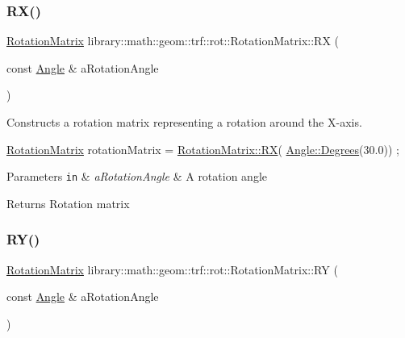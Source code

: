 \subsubsection{\texorpdfstring{R\+X()}{RX()}}
{\footnotesize\ttfamily \hyperlink{classlibrary_1_1math_1_1geom_1_1trf_1_1rot_1_1_rotation_matrix}{Rotation\+Matrix} library\+::math\+::geom\+::trf\+::rot\+::\+Rotation\+Matrix\+::\+RX (\begin{DoxyParamCaption}\item[{const \hyperlink{classlibrary_1_1math_1_1geom_1_1_angle}{Angle} \&}]{a\+Rotation\+Angle }\end{DoxyParamCaption})\hspace{0.3cm}{\ttfamily [static]}}



Constructs a rotation matrix representing a rotation around the X-\/axis. 


\begin{DoxyCode}
\hyperlink{classlibrary_1_1math_1_1geom_1_1trf_1_1rot_1_1_rotation_matrix_a667d2c05aa5b0cc88775938d11164cdc}{RotationMatrix} rotationMatrix = \hyperlink{classlibrary_1_1math_1_1geom_1_1trf_1_1rot_1_1_rotation_matrix_afe1aa8480e121065aa0c35fdf273811c}{RotationMatrix::RX}(
      \hyperlink{classlibrary_1_1math_1_1geom_1_1_angle_a64aa53e8420aeb6f671d86c65c370bc8}{Angle::Degrees}(30.0)) ;
\end{DoxyCode}



\begin{DoxyParams}[1]{Parameters}
\mbox{\tt in}  & {\em a\+Rotation\+Angle} & A rotation angle \\
\hline
\end{DoxyParams}
\begin{DoxyReturn}{Returns}
Rotation matrix 
\end{DoxyReturn}
\mbox{\label{classlibrary_1_1math_1_1geom_1_1trf_1_1rot_1_1_rotation_matrix_a165cef74c455c3651bd33cb2a86d2a93}} 
\subsubsection{\texorpdfstring{R\+Y()}{RY()}}
{\footnotesize\ttfamily \hyperlink{classlibrary_1_1math_1_1geom_1_1trf_1_1rot_1_1_rotation_matrix}{Rotation\+Matrix} library\+::math\+::geom\+::trf\+::rot\+::\+Rotation\+Matrix\+::\+RY (\begin{DoxyParamCaption}\item[{const \hyperlink{classlibrary_1_1math_1_1geom_1_1_angle}{Angle} \&}]{a\+Rotation\+Angle }\end{DoxyParamCaption})\hspace{0.3cm}{\ttfamily [static]}}



